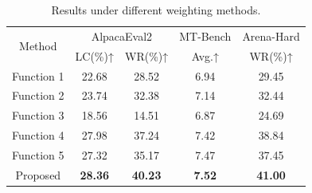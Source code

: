 \begin{table}[]
\normalsize
\centering
\footnotesize
\setlength{\tabcolsep}{1.5pt}
\begin{tabular}{ccccc}
\hline
\multirow{2}{*}{Method} & \multicolumn{2}{c}{AlpacaEval2} & MT-Bench & Arena-Hard \\
                        & LC(\%)↑        & WR(\%)↑        & Avg.↑    & WR(\%)↑    \\ \hline
Function 1              & 22.68          & 28.52          & 6.94    & 29.45      \\
Function 2              & 23.74          & 32.38          & 7.14    & 32.44      \\
Function 3              & 18.56          & 14.51          & 6.87    & 24.69      \\ 
Function 4              & 27.98          & 37.24          & 7.42    & 38.84      \\ 
Function 5              & 27.32          & 35.17          & 7.47    & 37.45      \\ 
\hline
Proposed                &\textbf{28.36}          & \textbf{40.23}          & \textbf{7.52}    & \textbf{41.00}     \\ \hline
\end{tabular}
\caption{Results under different weighting methods.}
\label{tab:curves}
\end{table}